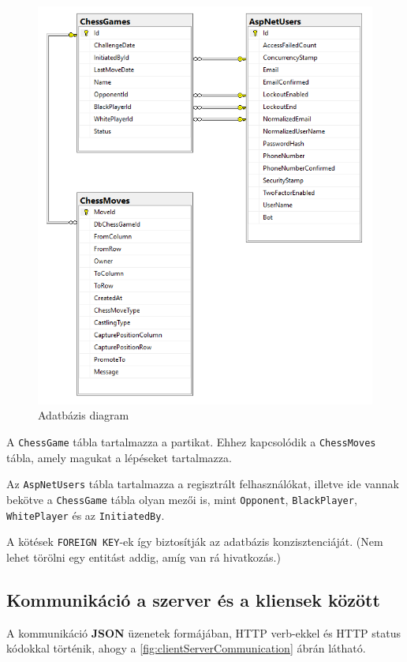 \documentclass[twoside, a4paper, 12pt]{book}
\begin{document}
\begin{figure}[htbp]
	\centering
	\includegraphics[width=1.0\textwidth]{img/dbdiagram.png}
	\caption{Adatbázis diagram}
	\label{fig:dbdiagram}
\end{figure}

A \texttt{ChessGame} tábla tartalmazza a partikat. Ehhez kapcsolódik a \texttt{ChessMoves} tábla, amely magukat a lépéseket tartalmazza.

Az \texttt{AspNetUsers} tábla tartalmazza a regisztrált felhasználókat, illetve ide vannak bekötve a \texttt{ChessGame} tábla olyan mezői is, mint \texttt{Opponent}, \texttt{BlackPlayer}, \texttt{WhitePlayer} és az \texttt{InitiatedBy}.

A kötések \texttt{FOREIGN KEY}-ek így biztosítják az adatbázis konzisztenciáját. (Nem lehet törölni egy entitást addig, amíg van rá hivatkozás.)

\subsection{Kommunikáció a szerver és a kliensek között}
A kommunikáció \textbf{JSON} üzenetek formájában, HTTP verb-ekkel és HTTP status kódokkal történik, ahogy a \ref{fig:clientServerCommunication} ábrán látható.
\end{document}
